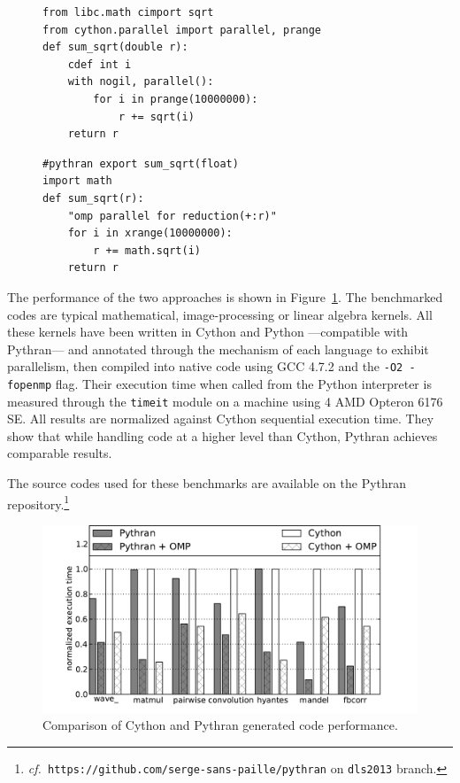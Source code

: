 \documentclass{sigplanconf}
\newcommand\see{\emph{cf.\ }}
\begin{document}
\begin{figure}

    \begin{lstlisting}[label={lst:cython-sample}, caption={Cython implementation
    of a parallel reduction.}]
from libc.math cimport sqrt
from cython.parallel import parallel, prange
def sum_sqrt(double r):
    cdef int i
    with nogil, parallel():
        for i in prange(10000000):
            r += sqrt(i)
    return r
    \end{lstlisting}
%
    \begin{lstlisting}[label={lst:pythran-sample}, caption={Pythran implementation
    of a parallel reduction.}]
#pythran export sum_sqrt(float)
import math
def sum_sqrt(r):
    "omp parallel for reduction(+:r)"
    for i in xrange(10000000):
        r += math.sqrt(i)
    return r
    \end{lstlisting}
\end{figure}



The performance of the two approaches is shown in
Figure~\ref{fig:cython-pythran}.  The benchmarked codes are typical
mathematical, image-processing or linear algebra kernels. All these kernels have
been written in Cython and Python ---compatible with Pythran--- and annotated
through the mechanism of each language to exhibit parallelism, then compiled
into native code using GCC 4.7.2 and the \texttt{-O2 -fopenmp} flag.  Their
execution time when called from the Python interpreter is measured through the
\texttt{timeit} module on a machine using 4 AMD Opteron 6176 SE.  All results
are normalized against Cython sequential execution time. They show that while
handling code at a higher level than Cython, Pythran achieves comparable
results.

The source codes used for these benchmarks are available on the Pythran
repository.\footnote{\see \texttt{https://github.com/serge-sans-paille/pythran}
    on \texttt{dls2013}
branch.} 

\begin{figure}[ht]
    \includegraphics[width=.5\textwidth]{cython}
    \caption{Comparison of Cython and Pythran generated code performance.}
    \label{fig:cython-pythran}
\end{figure}
\end{document}
